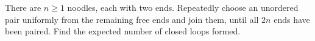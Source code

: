 There are $n\ge1$ noodles, each with two ends. Repeatedly choose an unordered pair uniformly from the remaining free ends and join them, until all $2n$ ends have been paired. Find the expected number of closed loops formed.
